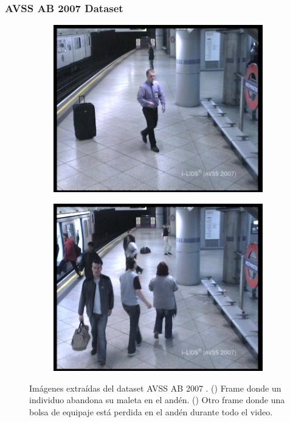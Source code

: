 \subsubsection{AVSS AB 2007 Dataset}

\begin{figure}[ht]
  \centering
  \begin{subfigure}[b]{0.4\textwidth}
    \includegraphics[width=\textwidth]{img/chapters/resultados/bases-datos/AVSSAB_1.jpg}
    \caption{}
    \label{fig:avssab2007_1}
  \end{subfigure}
  \qquad\qquad
  \begin{subfigure}[b]{0.4\textwidth}
    \includegraphics[width=\textwidth]{img/chapters/resultados/bases-datos/AVSSAB_2.jpg}
    \caption{}
    \label{fig:avssab2007_2}
  \end{subfigure}
  \caption{Imágenes extraídas del dataset AVSS AB 2007 \cite{AVSSAB2007-dataset}.
    (\protect{}) Frame donde un individuo abandona su maleta en el andén.
    (\protect{}) Otro frame donde una bolsa de equipaje está perdida en el andén durante todo el video.}
  \label{fig:avssab2007}
\end{figure}

